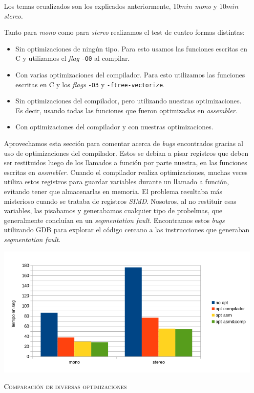\documentclass[%
    compressed,
    titlepage,
    narroweqnarray,
    inline,
    twoside,
    ]{ieee}
\begin{document}
Los temas ecualizados son los explicados anteriormente, $10min$ \textit{mono} y $10min$
\textit{stereo}.

Tanto para \textit{mono} como para \textit{stereo} realizamos el test de cuatro formas
distintas:
\begin{itemize}
    \item Sin optimizaciones de ning\'un tipo. Para esto usamos las funciones escritas
        en \textsc{C} y utilizamos el \textit{flag} \texttt{-O0} al compilar.
    \item Con varias optimizaciones del compilador. Para esto utilizamos
        las funciones escritas en \textsc{C} y los \textit{flags} \texttt{-O3} y
        \texttt{-ftree-vectorize}.
    \item Sin optimizaciones del compilador, pero utilizando nuestras optimizaciones.
        Es decir, usando todas las funciones que fueron optimizadas en \textit{assembler}.
    \item Con optimizaciones del compilador y con nuestras optimizaciones.
\end{itemize}

Aprovechamos esta secci\'on para comentar acerca de \textit{bugs} encontrados gracias al uso de
optimizaciones del compilador. Estos se deb\'ian a pisar registros que deben ser restituidos
luego de los llamados a funci\'on por parte nuestra, en las funciones escritas en \textit{assmebler}.
Cuando el compilador realiza optimizaciones, muchas veces utiliza estos registros para guardar
variables durante un llamado a funci\'on, evitando tener que almacenarlas en memoria.
El problema resultaba m\'as misterioso cuando se trataba de registros \textit{SIMD}.
Nosotros, al no restituir esas variables, las pisabamos y generabamos cualquier tipo de probelmas,
que generalmente conclu\'ian en un \textit{segmentation fault}.
Encontramos estos \textit{bugs} utilizando \textsc{GDB} para explorar el c\'odigo cercano
a las instrucciones que generaban \textit{segmentation fault}.

\includegraphics[width=1\textwidth]{img/segundo.png}
\begin{center} \textsc{Comparaci\'on de diversas optimizaciones} \end{center}
\end{document}
